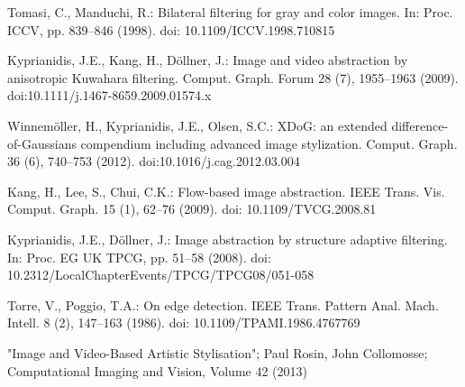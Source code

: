 \documentclass[10pt]{article}
\begin{document}
\begin{thebibliography}{99} %

Tomasi, C., Manduchi, R.: Bilateral filtering for gray and color images. In: Proc. ICCV, pp. 839–846 (1998). doi: 10.1109/ICCV.1998.710815

Kyprianidis, J.E., Kang, H., Döllner, J.: Image and video abstraction by anisotropic Kuwahara filtering. Comput. Graph. Forum 28 (7), 1955–1963 (2009). doi:10.1111/j.1467-8659.2009.01574.x

Winnemöller, H., Kyprianidis, J.E., Olsen, S.C.: XDoG: an extended difference-of-Gaussians compendium including advanced image stylization. Comput. Graph. 36 (6), 740–753 (2012). doi:10.1016/j.cag.2012.03.004

Kang, H., Lee, S., Chui, C.K.: Flow-based image abstraction. IEEE Trans. Vis. Comput. Graph. 15 (1), 62–76 (2009). doi: 10.1109/TVCG.2008.81

Kyprianidis, J.E., Döllner, J.: Image abstraction by structure adaptive filtering. In: Proc. EG UK TPCG, pp. 51–58 (2008). doi: 10.2312/LocalChapterEvents/TPCG/TPCG08/051-058

Torre, V., Poggio, T.A.: On edge detection. IEEE Trans. Pattern Anal. Mach. Intell. 8 (2), 147–163 (1986). doi: 10.1109/TPAMI.1986.4767769

"Image and Video-Based Artistic Stylisation"; Paul Rosin, John Collomosse; Computational Imaging and Vision, Volume 42 (2013)


\end{thebibliography}
\end{document}
